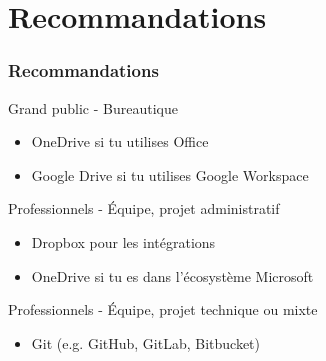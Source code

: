\documentclass[a4paper,11pt]{beamer}
\begin{document}
\section{Recommandations}
\begin{frame}
    \frametitle{Recommandations}
    \begin{block}{Grand public - Bureautique}
    \begin{itemize}
    	\item OneDrive si tu utilises Office
    	\item Google Drive si tu utilises Google Workspace
    \end{itemize}
    \end{block}
    \begin{block}{Professionnels - Équipe, projet administratif}
    \begin{itemize}
    	\item Dropbox pour les intégrations
    	\item OneDrive si tu es dans l’écosystème Microsoft
    \end{itemize}
    \end{block}
    \begin{block}{Professionnels - Équipe, projet technique ou mixte}
	 \begin{itemize}
    	\item Git (e.g. GitHub, GitLab, Bitbucket)
    \end{itemize}    
    \end{block}
\end{frame}
\end{document}
